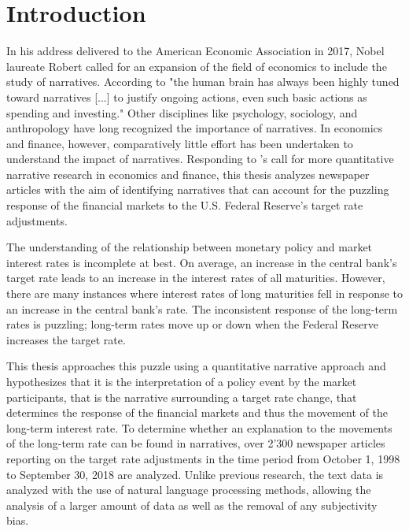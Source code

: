 \documentclass[11pt,a4paper,english,oneside]{book}
\numberwithin{equation}{chapter}
\begin{document}
\chapter{Introduction}
In his address delivered to the American Economic Association in 2017, Nobel laureate Robert \citeauthor{Shiller.2017} called for an expansion of the field of economics to include the study of narratives. According to \citeauthor{Shiller.2017} "the human brain has always been highly tuned toward narratives [...] to justify ongoing actions, even such basic actions as spending and investing." Other disciplines like psychology, sociology, and anthropology have long recognized the importance of narratives. In economics and finance, however, comparatively little effort has been undertaken to understand the impact of narratives. Responding to \citeauthor{Shiller.2017}'s call for more quantitative narrative research in economics and finance, this thesis analyzes newspaper articles with the aim of identifying narratives that can account for the puzzling response of the financial markets to the U.S. Federal Reserve's target rate adjustments. 

The understanding of the relationship between monetary policy and market interest rates is incomplete at best. On average, an increase in the central bank's target rate leads to an increase in the interest rates of all maturities. However, there are many instances where interest rates of long maturities fell in response to an increase in the central bank's rate. The inconsistent response of the long-term rates is puzzling; long-term rates move up or down when the Federal Reserve increases the target rate.

This thesis approaches this puzzle using a quantitative narrative approach and hypothesizes that it is the interpretation of a policy event by the market participants, that is the narrative surrounding a target rate change, that determines the response of the financial markets and thus the movement of the long-term interest rate. To determine whether an explanation to the movements of the long-term rate can be found in narratives, over 2'300 newspaper articles reporting on the target rate adjustments in the time period from October 1, 1998 to September 30, 2018 are analyzed. Unlike previous research, the text data is analyzed with the use of natural language processing methods, allowing the analysis of a larger amount of data as well as the removal of any subjectivity bias. 
\end{document}
